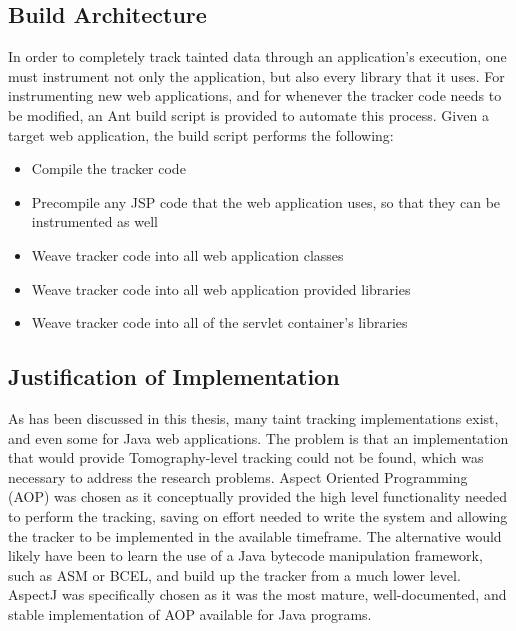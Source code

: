 \documentclass[msc,oneside]{ubcthesis}
\begin{document}
\subsection{Build Architecture}

In order to completely track tainted data through an application's execution, one must instrument not only the application, but also every library that it uses. For instrumenting new web applications, and for whenever the tracker code needs to be modified, an Ant build script is provided to automate this process. Given a target web application, the build script performs the following:

\begin{itemize}
\item Compile the tracker code
\item Precompile any JSP code that the web application uses, so that they can be instrumented as well
\item Weave tracker code into all web application classes
\item Weave tracker code into all web application provided libraries
\item Weave tracker code into all of the servlet container's libraries
\end{itemize}

\subsection{Justification of Implementation}
As has been discussed in this thesis, many taint tracking implementations exist, and even some for Java web applications. The problem is that an implementation that would provide Tomography-level tracking could not be found, which was necessary to address the research problems. Aspect Oriented Programming (AOP) was chosen as it conceptually provided the high level functionality needed to perform the tracking, saving on effort needed to write the system and allowing the tracker to be implemented in the available timeframe. The alternative would likely have been to learn the use of a Java bytecode manipulation framework, such as ASM or BCEL, and build up the tracker from a much lower level. AspectJ was specifically chosen as it was the most mature, well-documented, and stable implementation of AOP available for Java programs.


\end{document}
